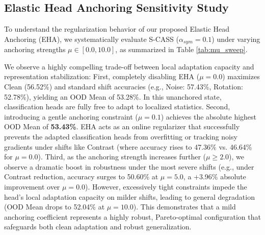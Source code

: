 \documentclass{article}
\theoremstyle{plain}
\theoremstyle{definition}
\theoremstyle{remark}
\begin{document}
\subsection{Elastic Head Anchoring Sensitivity Study}
To understand the regularization behavior of our proposed Elastic Head Anchoring (EHA), we systematically evaluate S-CASS ($\alpha_{sym}=0.1$) under varying anchoring strengths $\mu \in [0.0, 10.0]$, as summarized in Table \ref{tab:mu_sweep}. 

We observe a highly compelling trade-off between local adaptation capacity and representation stabilization:
First, completely disabling EHA ($\mu=0.0$) maximizes Clean (56.52\%) and standard shift accuracies (e.g., Noise: 57.43\%, Rotation: 52.78\%), yielding an OOD Mean of 53.28\%. In this unanchored state, classification heads are fully free to adapt to localized statistics.
Second, introducing a gentle anchoring constraint ($\mu=0.1$) achieves the absolute highest OOD Mean of \textbf{53.43\%}. EHA acts as an online regularizer that successfully prevents the adapted classification heads from overfitting or tracking noisy gradients under shifts like Contrast (where accuracy rises to 47.36\% vs. 46.64\% for $\mu=0.0$).
Third, as the anchoring strength increases further ($\mu \ge 2.0$), we observe a dramatic boost in robustness under the most severe shifts (e.g., under Contrast reduction, accuracy surges to 50.60\% at $\mu=5.0$, a +3.96\% absolute improvement over $\mu=0.0$). However, excessively tight constraints impede the head's local adaptation capacity on milder shifts, leading to general degradation (OOD Mean drops to 52.04\% at $\mu=10.0$). This demonstrates that a mild anchoring coefficient represents a highly robust, Pareto-optimal configuration that safeguards both clean adaptation and robust generalization.
\end{document}
